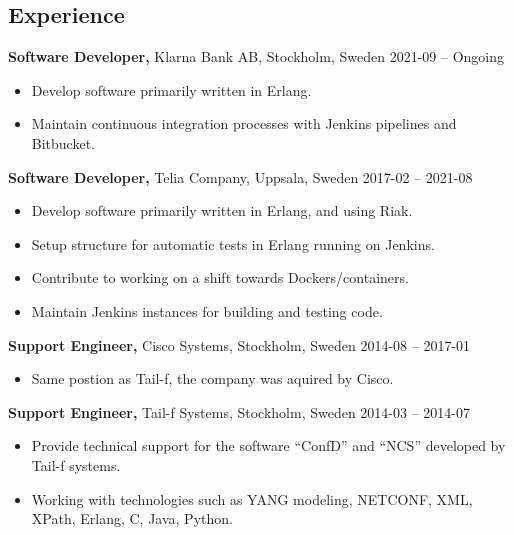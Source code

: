 \documentclass[margin]{res}
\begin{document}

\address{{\bf Contact information}\\

linkedin.com/in/tommymattsson\\
github.com/Taddic\\
}

\address{{\bf Address}\\
  \\
}

\begin{resume}

\section{Experience}
{\bf Software Developer,} Klarna Bank AB, Stockholm, Sweden \hfill 2021-09 -- Ongoing
 \begin{itemize} \itemsep -2pt  %
 \item Develop software primarily written in Erlang.
 \item Maintain continuous integration processes with Jenkins pipelines and Bitbucket.
 \end{itemize}

{\bf Software Developer,} Telia Company, Uppsala, Sweden \hfill 2017-02 -- 2021-08
 \begin{itemize} \itemsep -2pt  %
 \item Develop software primarily written in Erlang, and using Riak.
 \item Setup structure for automatic tests in Erlang running on Jenkins.
 \item Contribute to working on a shift towards Dockers/containers.
 \item Maintain Jenkins instances for building and testing code.
 \end{itemize}

{\bf Support Engineer,} Cisco Systems, Stockholm, Sweden \hfill 2014-08 -- 2017-01
 \begin{itemize} \itemsep -2pt  %
 \item Same postion as Tail-f, the company was aquired by Cisco.
 \end{itemize}

{\bf Support Engineer,} Tail-f Systems, Stockholm, Sweden \hfill 2014-03 -- 2014-07
 \begin{itemize} \itemsep -2pt  %
 \item Provide technical support for the software ``ConfD'' and ``NCS''
   developed by Tail-f systems.
 \item Working with technologies such as YANG modeling, NETCONF,
   XML, XPath, Erlang, C, Java, Python.
 \end{itemize}


\end{resume}
\end{document}
